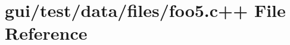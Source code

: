 \hypertarget{foo5_8c_09_09}{\section{gui/test/data/files/foo5.c++ File Reference}
\label{foo5_8c_09_09}
}
